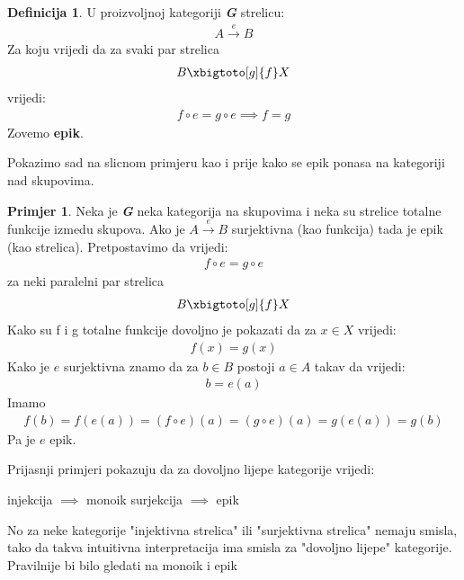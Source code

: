 \documentclass[11pt]{article}
\newcommand{\category}[1]{\textbf{\emph{#1}}}
\theoremstyle{definition}
\newtheorem{definition}{Definicija}
\newtheorem{primjer}{Primjer}
\begin{document}
  \begin{definition}
    U proizvoljnoj kategoriji \category{G} strelicu:
    \begin{align*}
      A \xrightarrow{e} B
    \end{align*}
    Za koju vrijedi da za svaki par strelica
    \begin{align*}
      B \xbigtoto[g]{f} X
    \end{align*}
    vrijedi:
    \begin{align}
      f \circ e = g \circ e \implies f = g
    \end{align}
    Zovemo \textbf{epik}.
  \end{definition}
  Pokazimo sad na slicnom primjeru kao i prije kako se epik ponasa na
  kategoriji nad skupovima.
  \begin{primjer}
    Neka je \category{G} neka kategorija na skupovima i neka su strelice
    totalne funkcije izmedu skupova.
    Ako je $A \xrightarrow{e} B$ surjektivna (kao funkcija) tada je epik (kao
    strelica).
    Pretpostavimo da vrijedi:
    \begin{align} \label{me:pr:2}
      f \circ e = g \circ e
    \end{align}
    za neki paralelni par strelica
    \begin{align*}
      B \xbigtoto[g]{f} X
    \end{align*}
    Kako su f i g totalne funkcije dovoljno je pokazati da za $x \in X$
    vrijedi:
    \begin{align*}
      f(x) = g(x)
    \end{align*}
    Kako je $e$ surjektivna znamo da za $b \in B$ postoji $a \in A$ takav da
    vrijedi:
    \begin{align*}
      b = e(a)
    \end{align*}
    Imamo
    \begin{align*}
      f(b) = f(e(a)) = (f \circ e)(a) = (g \circ e)(a) = g(e(a)) = g(b)
    \end{align*}
    Pa je $e$ epik.
  \end{primjer}
    Prijasnji primjeri pokazuju da za dovoljno lijepe kategorije vrijedi:
    \begin{center}
      injekcija $\implies$ monoik \qquad surjekcija $\implies$ epik
    \end{center}
    No za neke kategorije "injektivna strelica" ili "surjektivna strelica"
    nemaju smisla, tako da takva intuitivna interpretacija ima smisla za
    "dovoljno lijepe" kategorije. Pravilnije bi bilo gledati na monoik i epik
\end{document}
